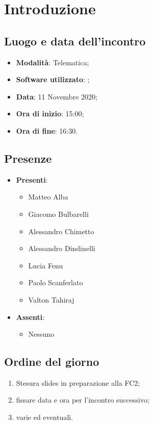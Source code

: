 \documentclass[]{article}
\begin{document}
	
	
	
	\newpage
	
	
	\section{Introduzione}
		\subsection{Luogo e data dell'incontro}
		\begin{itemize}
			\item \textbf{Modalità}: Telematica;
			\item \textbf{Software utilizzato}: ;
			\item \textbf{Data}: 11 Novembre 2020;
			\item \textbf{Ora di inizio}: 15:00;
			\item \textbf{Ora di fine}: 16:30.
		\end{itemize}
		
		\subsection{Presenze}
		\begin{itemize}
			\item \textbf{Presenti}: 
			\begin{itemize}
				\item Matteo Alba
				\item Giacomo Bulbarelli
				\item Alessandro Chimetto
				\item Alessandro Dindinelli
				\item Lucia Fenu
				\item Paolo Scanferlato
				\item Valton Tahiraj
			\end{itemize}
			\item \textbf{Assenti}:
			\begin{itemize}
				\item Nessuno
			\end{itemize}
		\end{itemize}
		
		\subsection{Ordine del giorno}
		\begin{enumerate}
			\item Stesura slides in preparazione alla FC2;
			\item fissare data e ora per l'incontro successivo;
			\item varie ed eventuali.
		\end{enumerate}
	
\end{document}
